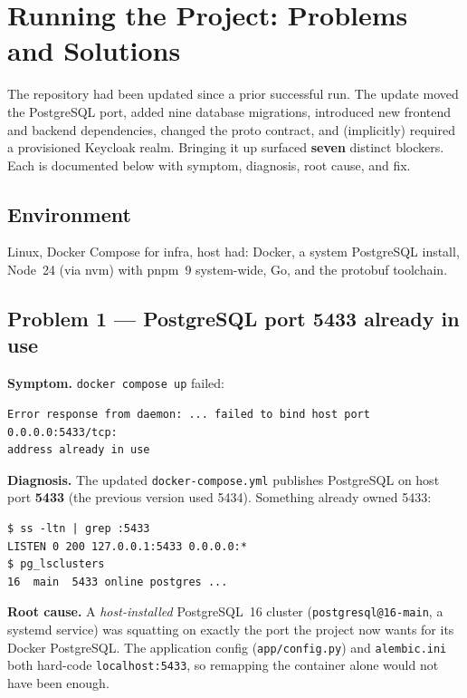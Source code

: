 \documentclass[11pt,a4paper]{article}
\newcommand{\code}[1]{\texttt{\small #1}}
\begin{document}
\section{Running the Project: Problems and Solutions}
\label{sec:problems}

The repository had been updated since a prior successful run. The update moved
the PostgreSQL port, added nine database migrations, introduced new frontend and
backend dependencies, changed the proto contract, and (implicitly) required a
provisioned Keycloak realm. Bringing it up surfaced \textbf{seven} distinct
blockers. Each is documented below with symptom, diagnosis, root cause, and fix.

\subsection*{Environment}
Linux, Docker Compose for infra, host had: Docker, a system PostgreSQL install,
Node~24 (via nvm) with pnpm~9 system-wide, Go, and the protobuf toolchain.

\subsection{Problem 1 --- PostgreSQL port 5433 already in use}

\textbf{Symptom.} \code{docker compose up} failed:
\begin{lstlisting}
Error response from daemon: ... failed to bind host port 0.0.0.0:5433/tcp:
address already in use
\end{lstlisting}

\textbf{Diagnosis.} The updated \code{docker-compose.yml} publishes PostgreSQL on
host port \textbf{5433} (the previous version used 5434). Something already owned
5433:
\begin{lstlisting}
$ ss -ltn | grep :5433
LISTEN 0 200 127.0.0.1:5433 0.0.0.0:*
$ pg_lsclusters
16  main  5433 online postgres ...
\end{lstlisting}

\textbf{Root cause.} A \emph{host-installed} PostgreSQL~16 cluster
(\code{postgresql@16-main}, a systemd service) was squatting on exactly the port
the project now wants for its Docker PostgreSQL. The application config
(\code{app/config.py}) and \code{alembic.ini} both hard-code \code{localhost:5433},
so remapping the container alone would not have been enough.
\end{document}
